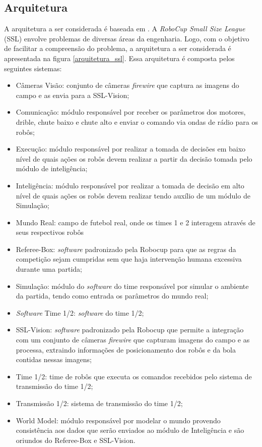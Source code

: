 \subsection{Arquitetura}

A arquitetura a ser considerada é baseada em \cite{felixnavarro}.
A \textit{RoboCup Small Size League} (SSL) envolve problemas de diversas áreas
da engenharia. Logo, com o objetivo de facilitar a compreensão do
problema, a arquitetura a ser considerada é apresentada na figura
\ref{arquitetura_ssl}. Essa arquitetura é composta pelos seguintes
sistemas:

\begin{itemize}
  \item Câmeras Visão: conjunto de câmeras \textit{firewire} que captura as imagens do
        campo e as envia para a SSL-Vision;
  \item Comunicação: módulo responsável por receber os parâmetros
        dos motores, drible, chute baixo e chute alto e enviar o comando via
        ondas de rádio para os robôs;
  \item Execução: módulo responsável por realizar a tomada de decisões
        em baixo nível de quais ações os robôs devem realizar a partir
        da decisão tomada pelo módulo de inteligência;
  \item Inteligência: módulo responsável por realizar a tomada de
        decisão em alto nível de quais ações os robôs devem realizar
        tendo auxílio de um módulo de Simulação;
  \item Mundo Real: campo de futebol real, onde os times 1 e 2 interagem
        através de seus respectivos robôs
  \item Referee-Box: \textit{software} padronizado pela Robocup para que as
        regras da competição sejam cumpridas sem que haja intervenção
        humana excessiva durante uma partida;
  \item Simulação: módulo do \textit{software} do time responsável por simular
        o ambiente da partida, tendo como entrada os parâmetros do mundo
        real;
  \item \textit{Software} Time 1/2: \textit{software} do time 1/2;
  \item SSL-Vision: \textit{software} padronizado pela Robocup que permite a
        integração com um conjunto de câmeras \textit{firewire} que capturam
        imagens do campo e as processa, extraindo informações de posicionamento
        dos robôs e da bola contidas nessas imagens;
  \item Time 1/2: time de robôs que executa os comandos recebidos pelo
        sistema de transmissão do time 1/2;
  \item Transmissão 1/2: sistema de transmissão do time 1/2;
  \item World Model: módulo responsável por modelar o mundo
        provendo consistência aos dados que serão enviados ao módulo de
        Inteligência e são oriundos do Referee-Box e SSL-Vision.
\end{itemize}

